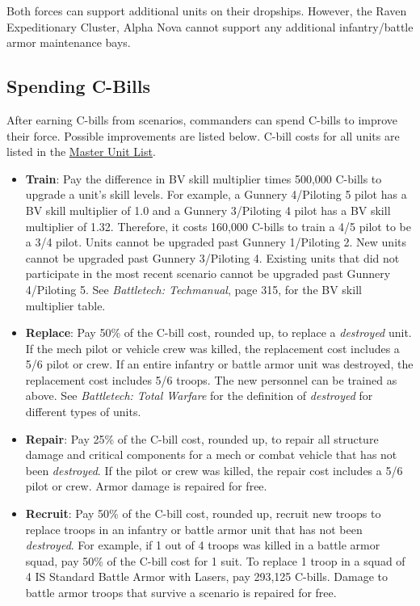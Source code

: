 \documentclass[UTF8]{article}
\begin{document}
Both forces can support additional units on their dropships.
However, the Raven Expeditionary Cluster, Alpha Nova cannot support any additional infantry/battle armor maintenance bays.\\

\newpage

\subsection{Spending C-Bills}

After earning C-bills from scenarios, commanders can spend C-bills to improve their force.
Possible improvements are listed below.
C-bill costs for all units are listed in the \href{http://www.masterunitlist.info/}{Master Unit List}.\\

\begin{itemize}

\item {\bf Train}: Pay the difference in BV skill multiplier times 500,000 C-bills to upgrade a unit's skill levels.
For example, a Gunnery 4/Piloting 5 pilot has a BV skill multiplier of 1.0 and a Gunnery 3/Piloting 4 pilot has a BV skill multiplier of 1.32.
Therefore, it costs 160,000 C-bills to train a 4/5 pilot to be a 3/4 pilot.
Units cannot be upgraded past Gunnery 1/Piloting 2.
New units cannot be upgraded past Gunnery 3/Piloting 4.
Existing units that did not participate in the most recent scenario cannot be upgraded past Gunnery 4/Piloting 5.
See \emph{Battletech: Techmanual}, page 315, for the BV skill multiplier table.

\item {\bf Replace}: Pay 50\% of the C-bill cost, rounded up, to replace a \emph{destroyed} unit.
If the mech pilot or vehicle crew was killed, the replacement cost includes a 5/6 pilot or crew.
If an entire infantry or battle armor unit was destroyed, the replacement cost includes 5/6 troops.
The new personnel can be trained as above.
See \emph{Battletech: Total Warfare} for the definition of \emph{destroyed} for different types of units.

\item {\bf Repair}: Pay 25\% of the C-bill cost, rounded up, to repair all structure damage and critical components for a mech or combat vehicle that has not been \emph{destroyed}.
If the pilot or crew was killed, the repair cost includes a 5/6 pilot or crew.
Armor damage is repaired for free.

\item {\bf Recruit}: Pay 50\% of the C-bill cost, rounded up, recruit new troops to replace troops in an infantry or battle armor unit that has not been \emph{destroyed}.
For example, if 1 out of 4 troops was killed in a battle armor squad, pay 50\% of the C-bill cost for 1 suit.
To replace 1 troop in a squad of 4 IS Standard Battle Armor with Lasers, pay 293,125 C-bills.
Damage to battle armor troops that survive a scenario is repaired for free.


\end{itemize}
\end{document}
